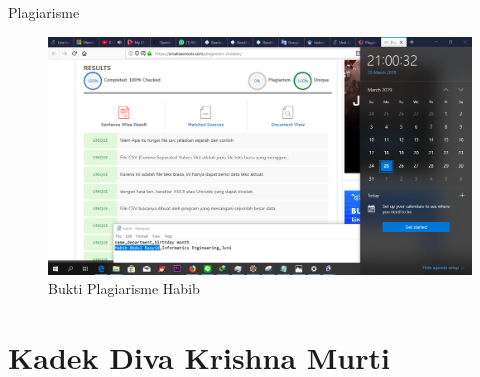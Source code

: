 \begin {enumerate}
Plagiarisme
\begin{figure}[h]
\centering
\includegraphics[scale=0.2]{figures/plagiarism_habib.png}
\caption{Bukti Plagiarisme Habib}
\label{fig:plagiarisme}
\end{figure}
\end{enumerate}


\section{Kadek Diva Krishna Murti}

